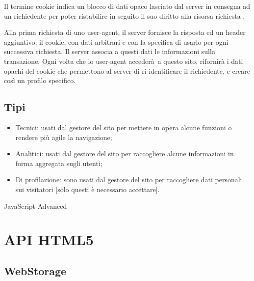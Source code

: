 \documentclass[
]{article}
\providecommand{\tightlist}{%
  \setlength{\itemsep}{0pt}\setlength{\parskip}{0pt}}
\begin{document}
{}

{Il termine cookie indica un blocco di dati opaco lasciato dal server in
consegna ad un richiedente per poter ristabilire in seguito il suo
diritto alla risorsa richiesta . }

{}

{Alla prima richiesta di uno user-agent, il server fornisce la risposta
ed un header aggiuntivo, il cookie, con dati arbitrari e con la
specifica di usarlo per ogni successiva richiesta. Il server associa a
questi dati le informazioni sulla transazione. Ogni volta che lo
user-agent }{accederà}{~a questo sito, rifornirà i dati opachi del
cookie che permettono al server di ri-identificare il richiedente, e
creare così un profilo specifico. }

\subsection{\texorpdfstring{{Tipi}}{Tipi}}\label{h.8zti3wblacc2}

\begin{itemize}
\tightlist
\item
  {Tecnici}{: usati dal gestore del sito per mettere in opera alcune
  funzioni o rendere più agile la navigazione;}
\item
  {Analitici}{: usati dal gestore del sito per raccogliere alcune
  informazioni in forma aggregata sugli utenti;}
\item
  {Di profilazione}{: sono usati dal gestore del sito per raccogliere
  dati personali sui visitatori {[}solo questi è necessario
  accettare{]}.}
\end{itemize}

{}

{}

{}

{}

{}

{}

{JavaScript Advanced}

\section{\texorpdfstring{{API HTML5}}{API HTML5}}\label{h.7b8tns7uhier}

\subsection{\texorpdfstring{{WebStorage}}{WebStorage}}\label{h.35qskvq49n6o}
\end{document}
